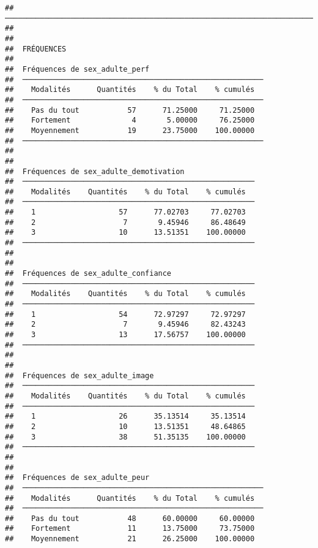 \documentclass[
]{article}
\begin{document}
\begin{verbatim}
##  ──────────────────────────────────────────────────────────────────────────────────────────────────────────────────────────────────────────────────────────────────────────────────────────────────────────────────────────────────────── 
## 
## 
##  FRÉQUENCES
## 
##  Fréquences de sex_adulte_perf                           
##  ─────────────────────────────────────────────────────── 
##    Modalités      Quantités    % du Total    % cumulés   
##  ─────────────────────────────────────────────────────── 
##    Pas du tout           57      71.25000     71.25000   
##    Fortement              4       5.00000     76.25000   
##    Moyennement           19      23.75000    100.00000   
##  ─────────────────────────────────────────────────────── 
## 
## 
##  Fréquences de sex_adulte_demotivation                 
##  ───────────────────────────────────────────────────── 
##    Modalités    Quantités    % du Total    % cumulés   
##  ───────────────────────────────────────────────────── 
##    1                   57      77.02703     77.02703   
##    2                    7       9.45946     86.48649   
##    3                   10      13.51351    100.00000   
##  ───────────────────────────────────────────────────── 
## 
## 
##  Fréquences de sex_adulte_confiance                    
##  ───────────────────────────────────────────────────── 
##    Modalités    Quantités    % du Total    % cumulés   
##  ───────────────────────────────────────────────────── 
##    1                   54      72.97297     72.97297   
##    2                    7       9.45946     82.43243   
##    3                   13      17.56757    100.00000   
##  ───────────────────────────────────────────────────── 
## 
## 
##  Fréquences de sex_adulte_image                        
##  ───────────────────────────────────────────────────── 
##    Modalités    Quantités    % du Total    % cumulés   
##  ───────────────────────────────────────────────────── 
##    1                   26      35.13514     35.13514   
##    2                   10      13.51351     48.64865   
##    3                   38      51.35135    100.00000   
##  ───────────────────────────────────────────────────── 
## 
## 
##  Fréquences de sex_adulte_peur                           
##  ─────────────────────────────────────────────────────── 
##    Modalités      Quantités    % du Total    % cumulés   
##  ─────────────────────────────────────────────────────── 
##    Pas du tout           48      60.00000     60.00000   
##    Fortement             11      13.75000     73.75000   
##    Moyennement           21      26.25000    100.00000   

\end{verbatim}
\end{document}
